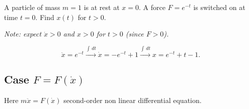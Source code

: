 \documentclass[10pt, a4paper]{article}
\begin{document}
\begin{example}
    A particle of mass $m = 1$ is at rest at $x = 0$.
    A force $F = e ^ {-t}$ is switched on at time $t = 0$.
    Find $x(t)$ for $t > 0$.

    \textit{Note:
    expect $\dot{x} > 0$ and $x > 0$ for $t > 0$
    (since $F > 0$).}

    \begin{solution}
        \[
        \ddot{x} = e ^ {-t} \xrightarrow{\int\,dt} \dot{x} = -e ^ {-t} + 1 \xrightarrow{\int\,dt} x = e ^ {-t} + t - 1.
        \]
    \end{solution}
\end{example}

\subsection{Case $F = F(\dot{x})$}

\begin{remark}
    Here $m\ddot{x} = F(\dot{x})$ second-order non linear differential equation.
\end{remark}
\end{document}
